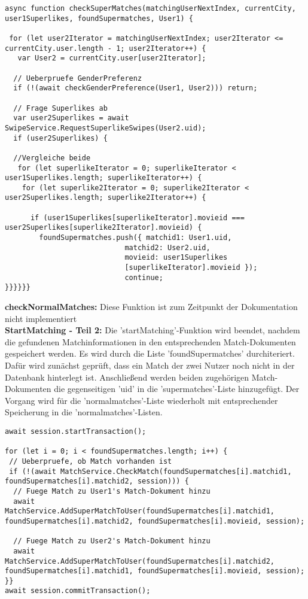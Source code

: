 \begin{lstlisting}[caption=Match Manager - checkSuperMatches, label=lst:checkSuperMatches]
async function checkSuperMatches(matchingUserNextIndex, currentCity, user1Superlikes, foundSupermatches, User1) {

 for (let user2Iterator = matchingUserNextIndex; user2Iterator <= currentCity.user.length - 1; user2Iterator++) {
   var User2 = currentCity.user[user2Iterator];
   
  // Ueberpruefe GenderPreferenz
  if (!(await checkGenderPreference(User1, User2))) return;
  
  // Frage Superlikes ab
  var user2Superlikes = await SwipeService.RequestSuperlikeSwipes(User2.uid);
  if (user2Superlikes) {
        
  //Vergleiche beide
   for (let superlikeIterator = 0; superlikeIterator < user1Superlikes.length; superlikeIterator++) {
    for (let superlike2Iterator = 0; superlike2Iterator < user2Superlikes.length; superlike2Iterator++) {
    
      if (user1Superlikes[superlikeIterator].movieid === user2Superlikes[superlike2Iterator].movieid) {
        foundSupermatches.push({ matchid1: User1.uid,
                            matchid2: User2.uid, 
                            movieid: user1Superlikes
                            [superlikeIterator].movieid });
                            continue;
}}}}}}
\end{lstlisting}

\noindent
\textbf{checkNormalMatches:}
Diese Funktion ist zum Zeitpunkt der Dokumentation nicht implementiert \\

\noindent
\textbf{StartMatching - Teil 2:}
Die 'startMatching'-Funktion wird beendet, nachdem die gefundenen Matchinformationen in den entsprechenden Match-Dokumenten gespeichert werden. Es wird durch die Liste 'foundSupermatches' durchiteriert. Dafür wird zunächst geprüft, dass ein Match der zwei Nutzer noch nicht in der Datenbank hinterlegt ist. Anschließend werden beiden zugehörigen Match-Dokumenten die gegenseitigen 'uid' in die 'supermatches'-Liste hinzugefügt.
Der Vorgang wird für die 'normalmatches'-Liste wiederholt mit entsprechender Speicherung in die 'normalmatches'-Listen.

\begin{lstlisting}[caption=Match Manager - startMatching - Teil 2: Speichere Matches, label=lst:startMatchingteil2]
await session.startTransaction();

for (let i = 0; i < foundSupermatches.length; i++) {        
 // Ueberpruefe, ob Match vorhanden ist
 if (!(await MatchService.CheckMatch(foundSupermatches[i].matchid1,   foundSupermatches[i].matchid2, session))) {
  // Fuege Match zu User1's Match-Dokument hinzu
  await MatchService.AddSuperMatchToUser(foundSupermatches[i].matchid1, foundSupermatches[i].matchid2, foundSupermatches[i].movieid, session);

  // Fuege Match zu User2's Match-Dokument hinzu
  await MatchService.AddSuperMatchToUser(foundSupermatches[i].matchid2,  foundSupermatches[i].matchid1, foundSupermatches[i].movieid, session);
}}
await session.commitTransaction();
\end{lstlisting}